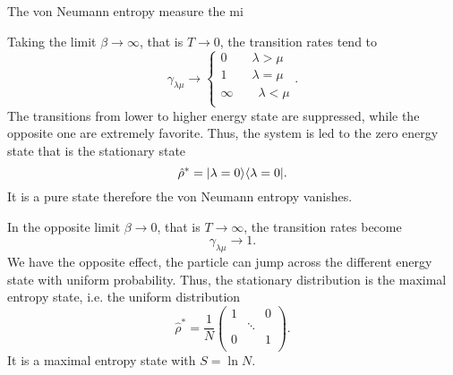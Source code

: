 The von Neumann entropy measure the mi

Taking the limit $\beta \rightarrow \infty$, that is $T  \rightarrow 0$, the transition rates tend to
\begin{equation}
    \gamma_{\lambda\mu} \rightarrow \left\{\begin{aligned}
        0 \qquad \lambda > \mu\\
        1 \qquad \lambda = \mu\\
        \infty \qquad  \lambda < \mu \\
    \end{aligned}\right. . 
\end{equation}
The transitions from lower to higher energy state are suppressed, while the opposite one are extremely favorite. Thus, the system is led to the zero energy state that is the stationary state
\begin{equation}\label{beta_inf_stationary_distribution}
    \hat\rho^* = \lvert\lambda = 0\rangle\langle\lambda = 0\rvert.
\end{equation} 
It is a pure state therefore the von Neumann entropy vanishes.

In the opposite limit $\beta \rightarrow 0$, that is $T \rightarrow \infty$, the transition rates become
\begin{equation}
    \gamma_{\lambda\mu} \rightarrow 1.
\end{equation}
We have the opposite effect, the particle can jump across the different energy state with uniform probability. Thus, the stationary distribution is the maximal entropy state, i.e. the uniform distribution
\begin{equation}
    \hat\rho^* = \frac{1}{N}\begin{pmatrix}
        1&&0\\
        &\ddots&\\
        0&&1\\
    \end{pmatrix}.
\end{equation}
It is a maximal entropy state with $S = \ln N$.

